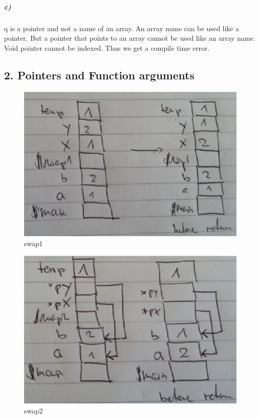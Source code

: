 \documentclass[12pt]{article}
\begin{document}
\subparagraph{c)}
q is a pointer and not a name of an array. An array name can be used like a pointer. But a pointer that points to an array cannot be used like an array name.
Void pointer cannot be indexed. Thus we get a compile time error.

\subsection*{2. Pointers and Function arguments}

\begin{figure}[!htb]
\centering
\includegraphics[scale=0.5]{eps/2_swap1.eps}  
\caption{swap1}
\end{figure}

\begin{figure}[!htb]
\centering
\includegraphics[scale=0.5]{eps/2_swap2.eps}  
\caption{swap2}
\end{figure}
\end{document}
